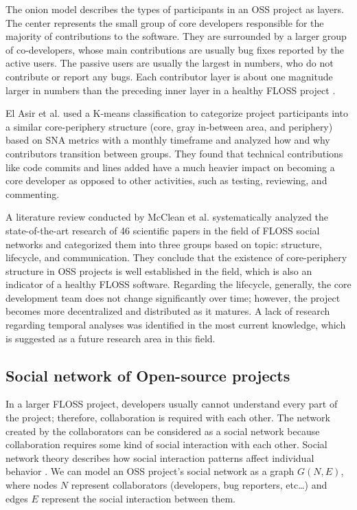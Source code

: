 The onion model describes the types of participants in an OSS project as layers. The center represents the small group of core developers responsible for the majority of contributions to the software. They are surrounded by a larger group of co-developers, whose main contributions are usually bug fixes reported by the active users. The passive users are usually the largest in numbers, who do not contribute or report any bugs. Each contributor layer is about one magnitude larger in numbers than the preceding inner layer in a healthy FLOSS project \cite{mockusTwoCaseStudies2002}.

El Asir et al. \cite{elasriPeripheryCoreTemporal2017} used a K-means classification to categorize project participants into a similar core-periphery structure (core, gray in-between area, and periphery) based on SNA metrics with a monthly timeframe and analyzed how and why contributors transition between groups. They found that technical contributions like code commits and lines added have a much heavier impact on becoming a core developer as opposed to other activities, such as testing, reviewing, and commenting.

A literature review conducted by McClean et al. \cite{mccleanSocialNetworkAnalysis2021} systematically analyzed the state-of-the-art research of 46 scientific papers in the field of FLOSS social networks and categorized them into three groups based on topic: structure, lifecycle, and communication. They conclude that the existence of core-periphery structure in OSS projects is well established in the field, which is also an indicator of a healthy FLOSS software. Regarding the lifecycle, generally, the core development team does not change significantly over time; however, the project becomes more decentralized and distributed as it matures. A lack of research regarding temporal analyses was identified in the most current knowledge, which is suggested as a future research area in this field.

\subsection{Social network of Open-source projects}
In a larger FLOSS project, developers usually cannot understand every part of the project; therefore, collaboration is required with each other. The network created by the collaborators can be considered as a social network because collaboration requires some kind of social interaction with each other. Social network theory describes how social interaction patterns affect individual behavior \cite{martinez-torresGeneticSearchPatterns2012}. We can model an OSS project's social network as a graph $G(N, E)$, where nodes $N$ represent collaborators (developers, bug reporters, etc\dots) and edges $E$ represent the social interaction between them. 

